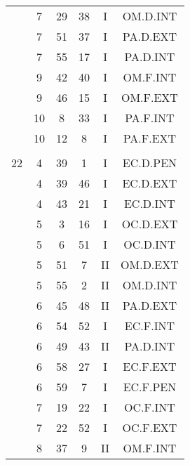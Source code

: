 \documentclass[12pt, a4paper]{article}
\begin{document}
\begin{multicols}{3}
{\begin{tabular}{c c c c c c}
	 	 	 	 & 7 & 29 & 38 & I & OM.D.INT\\%
	 	 	 	 & 7 & 51 & 37 & I & PA.D.EXT\\%
	 	 	 	 & 7 & 55 & 17 & I & PA.D.INT\\%
	 	 	 	 & 9 & 42 & 40 & I & OM.F.INT\\%
	 	 	 	 & 9 & 46 & 15 & I & OM.F.EXT\\%
	 	 	 	 & 10 & 8 & 33 & I & PA.F.INT\\%
	 	 	 	 & 10 & 12 & 8 & I & PA.F.EXT\\%
	 	 	 	 & & & & & \\%
	 	 	 	22 & 4 & 39 & 1 & I & EC.D.PEN\\%
	 	 	 	 & 4 & 39 & 46 & I & EC.D.EXT\\%
	 	 	 	 & 4 & 43 & 21 & I & EC.D.INT\\%
	 	 	 	 & 5 & 3 & 16 & I & OC.D.EXT\\%
	 	 	 	 & 5 & 6 & 51 & I & OC.D.INT\\%
	 	 	 	 & 5 & 51 & 7 & II & OM.D.EXT\\%
	 	 	 	 & 5 & 55 & 2 & II & OM.D.INT\\%
	 	 	 	 & 6 & 45 & 48 & II & PA.D.EXT\\%
	 	 	 	 & 6 & 54 & 52 & I & EC.F.INT\\%
	 	 	 	 & 6 & 49 & 43 & II & PA.D.INT\\%
	 	 	 	 & 6 & 58 & 27 & I & EC.F.EXT\\%
	 	 	 	 & 6 & 59 & 7 & I & EC.F.PEN\\%
	 	 	 	 & 7 & 19 & 22 & I & OC.F.INT\\%
	 	 	 	 & 7 & 22 & 52 & I & OC.F.EXT\\%
	 	 	 	 & 8 & 37 & 9 & II & OM.F.INT\\%

\end{tabular}}
\end{multicols}
\end{document}

